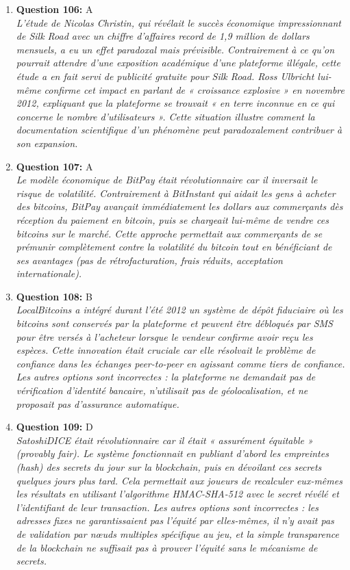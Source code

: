\documentclass[12pt,a4paper]{article}
\begin{document}
\begin{enumerate}
\item \textbf{Question 106:} A
\\ \textit{L'étude de Nicolas Christin, qui révélait le succès économique impressionnant de Silk Road avec un chiffre d'affaires record de 1,9 million de dollars mensuels, a eu un effet paradoxal mais prévisible. Contrairement à ce qu'on pourrait attendre d'une exposition académique d'une plateforme illégale, cette étude a en fait servi de publicité gratuite pour Silk Road. Ross Ulbricht lui-même confirme cet impact en parlant de « croissance explosive » en novembre 2012, expliquant que la plateforme se trouvait « en terre inconnue en ce qui concerne le nombre d'utilisateurs ». Cette situation illustre comment la documentation scientifique d'un phénomène peut paradoxalement contribuer à son expansion.}

\item \textbf{Question 107:} A
\\ \textit{Le modèle économique de BitPay était révolutionnaire car il inversait le risque de volatilité. Contrairement à BitInstant qui aidait les gens à acheter des bitcoins, BitPay avançait immédiatement les dollars aux commerçants dès réception du paiement en bitcoin, puis se chargeait lui-même de vendre ces bitcoins sur le marché. Cette approche permettait aux commerçants de se prémunir complètement contre la volatilité du bitcoin tout en bénéficiant de ses avantages (pas de rétrofacturation, frais réduits, acceptation internationale).}

\item \textbf{Question 108:} B
\\ \textit{LocalBitcoins a intégré durant l'été 2012 un système de dépôt fiduciaire où les bitcoins sont conservés par la plateforme et peuvent être débloqués par SMS pour être versés à l'acheteur lorsque le vendeur confirme avoir reçu les espèces. Cette innovation était cruciale car elle résolvait le problème de confiance dans les échanges peer-to-peer en agissant comme tiers de confiance. Les autres options sont incorrectes : la plateforme ne demandait pas de vérification d'identité bancaire, n'utilisait pas de géolocalisation, et ne proposait pas d'assurance automatique.}

\item \textbf{Question 109:} D
\\ \textit{SatoshiDICE était révolutionnaire car il était « assurément équitable » (provably fair). Le système fonctionnait en publiant d'abord les empreintes (hash) des secrets du jour sur la blockchain, puis en dévoilant ces secrets quelques jours plus tard. Cela permettait aux joueurs de recalculer eux-mêmes les résultats en utilisant l'algorithme HMAC-SHA-512 avec le secret révélé et l'identifiant de leur transaction. Les autres options sont incorrectes : les adresses fixes ne garantissaient pas l'équité par elles-mêmes, il n'y avait pas de validation par nœuds multiples spécifique au jeu, et la simple transparence de la blockchain ne suffisait pas à prouver l'équité sans le mécanisme de secrets.}


\end{enumerate}
\end{document}

